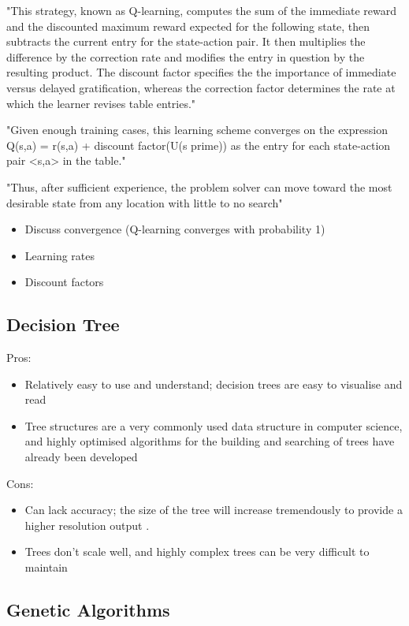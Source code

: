 \documentclass[a4paper,oneside]{report}
\begin{document}
"This strategy, known as Q-learning, computes the sum of the immediate reward and the discounted maximum reward expected for the following state, then subtracts the current entry for the state-action pair. It then multiplies the difference by the correction rate and modifies the entry in question by the resulting product. The discount factor specifies the the importance of immediate versus delayed gratification, whereas the correction factor determines the rate at which the learner revises table entries."

"Given enough training cases, this learning scheme converges on the expression Q(s,a) = r(s,a) + discount factor(U(s prime)) as the entry for each state-action pair <s,a> in the table."

"Thus, after sufficient experience, the problem solver can move toward the most desirable state from any location with little to no search"

\begin{itemize}
	\item Discuss convergence (Q-learning converges with probability 1)
	\item Learning rates
	\item Discount factors
\end{itemize}

\subsection{Decision Tree}

Pros:
\begin{itemize}
	\item Relatively easy to use and understand; decision trees are easy to visualise and read
	\item Tree structures are a very commonly used data structure in computer science, and highly optimised algorithms for the building and searching of trees have already been developed
\end{itemize}

\noindent Cons:
\begin{itemize}
	\item Can lack accuracy; the size of the tree will increase tremendously to provide a higher resolution output \cite{schwab2004ai}.
	\item Trees don't scale well, and highly complex trees can be very difficult to maintain
\end{itemize}

\subsection{Genetic Algorithms}
\end{document}
